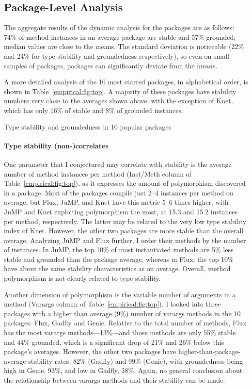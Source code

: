\documentclass[oneside,openright,titlepage,numbers=noenddot,%
headinclude,footinclude,cleardoublepage=empty,abstract=on,
BCOR=5mm,paper=a4,fontsize=11pt,
dvipsnames
]{scrreprt}
\begin{document}
\subsection{Package-Level Analysis}

The aggregate results of the dynamic analysis for the \goodpkgsnum packages are
as follows: 74\% of method instances in an average package are stable and 57\%
grounded; median values are close to the means. The standard deviation is
noticeable (22\% and 24\% for type stability and groundedness respectively), so
even on small samples of packages, packages can significantly deviate from
the means.

A more detailed analysis of the 10 most starred packages, in alphabetical order,
is shown in Table~\ref{empirical:fig:top}. A majority of these packages have
stability numbers very close to the averages shown above, with the exception of
Knet, which has only 16\% of stable and 8\% of grounded instances.


\begin{table}[h]\small
\caption{Type stability and groundedness in 10 popular packages}%
\label{empirical:fig:top}
\centering

\end{table}


\paragraph{Type stability (non-)correlates}
One parameter that I conjectured may correlate with stability is the average
number of method instances per method (Inst/Meth column of
Table~\ref{empirical:fig:top}), as it expresses the amount of polymorphism
discovered in a package. Most of the packages compile just 2--4 instances per
method on average, but Flux, JuMP, and Knet have this metric 5--6 times higher,
with JuMP and Knet exploiting polymorphism the most, at 15.3 and 15.2
instances per method, respectively. The latter may be related to the very low type stability
index of Knet. However, the other two packages are more stable than the overall
average. Analyzing JuMP and Flux further, I order their methods by the number
of instances. In JuMP, the top 10\% of most instantiated methods are 5\% less
stable and grounded than the package average, whereas in Flux, the top 10\% have
about the same stability characteristics as on average. Overall,
method polymorphism is not clearly related to type stability.

Another dimension of polymorphism is the variable number of arguments in a
method (Varargs column of Table~\ref{empirical:fig:top}). I looked into three
packages with a higher than average (9\%) number of varargs methods in the 10
packages: Flux, Gadfly and Genie. Relative to the total number of methods, Flux has the most
varargs methods---13\%---and those methods are only 55\% stable and 44\%
grounded, which is a significant drop of 21\% and 26\% below this package's
averages. However, the other two packages have higher-than-package-average
stability rates, 82\% (Gadfly) and 99\% (Genie), with groundedness being high in
Genie, 93\%, and low in Gadfly, 38\%. Again, no general conclusion about the
relationship between varargs methods and their stability can be made.
\end{document}
